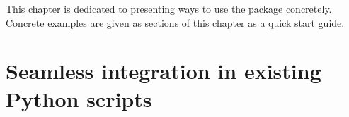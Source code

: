 This chapter is dedicated to presenting ways to use the package concretely. Concrete examples are given as sections of this chapter as a quick start guide.

\section{Seamless integration in existing Python scripts}\label{subsec:how_do_i.integration}
    